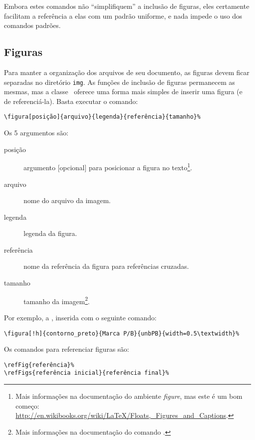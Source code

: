 Embora estes comandos não ``simplifiquem'' a inclusão de figuras, eles
certamente facilitam a referência a elas com um padrão uniforme, e nada impede o
uso dos comandos padrões.

\subsection{Figuras}
Para manter a organização dos arquivos de seu documento, as figuras devem ficar
separadas no diretório \texttt{img}. As funções de inclusão de figuras permanecem
as mesmas, mas a classe \unbcic\ oferece uma forma mais simples de inserir uma
figura (e de referenciá-la). Basta executar o comando:

\begin{verbatim}
\figura[posição]{arquivo}{legenda}{referência}{tamanho}%
\end{verbatim}

Os 5 argumentos são:
\begin{description}
\item[posição] argumento [opcional] para posicionar a figura no texto\footnote{Mais
informações na documentação do ambiente \emph{figure}, mas este é um bom começo: \url{http://en.wikibooks.org/wiki/LaTeX/Floats,_Figures_and_Captions}.}.
\item[arquivo] nome do arquivo da imagem.
\item[legenda] legenda da figura.
\item[referência] nome da referência da figura para referências cruzadas.
\item[tamanho] tamanho da imagem\footnote{Mais informações na documentação do comando
.}.
\end{description}

Por exemplo, a , inserida com o seguinte comando:

\begin{verbatim}
\figura[!h]{contorno_preto}{Marca P/B}{unbPB}{width=0.5\textwidth}%
\end{verbatim}

%

Os comandos para referenciar figuras são:

\begin{verbatim}
\refFig{referência}%
\refFigs{referência inicial}{referência final}%
\end{verbatim}

